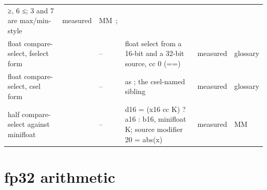 \begin{xltabular}{\linewidth}{@{}>{\hsize}Xll>{\hsize}X>{\hsize}X>{\hsize}X@{}}
≥, 6 ≤; 3 and 7 are max/min-style & measured & MM~;  \\
float compare-select, fselect form &  & – & float select from a 16-bit and a 32-bit source, cc 0 (==) & measured & glossary \\
float compare-select, csel form &  & – & as ; the csel-named
sibling & measured & glossary \\
half compare-select against minifloat &  & – & d16 = (x16 cc K) ? a16 : b16, minifloat K; source modifier 20 = abs(x) & measured & MM~ \\
\bottomrule
\end{xltabular}

\section{fp32 arithmetic}\label{sec:fp32-arithmetic-2}

